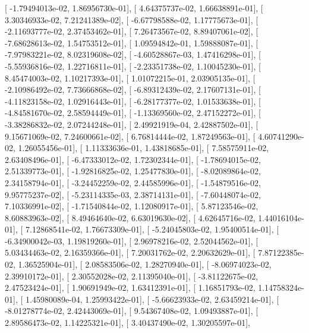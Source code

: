 \documentclass{article}
\begin{document}
       [ -1.79494013e-02,   1.86956730e-01],
       [  4.64375737e-02,   1.66638891e-01],
       [  3.30346933e-02,   7.21241389e-02],
       [ -6.67798588e-02,   1.17775673e-01],
       [ -2.11693777e-02,   2.37453462e-01],
       [  7.26473567e-02,   8.89407061e-02],
       [ -7.68628613e-02,   1.54753512e-01],
       [  1.09594842e-01,   1.59888087e-01],
       [ -7.97983221e-02,   8.02319608e-02],
       [ -4.60528867e-03,   1.47416298e-01],
       [ -5.55936816e-02,   1.22716811e-01],
       [ -2.23351738e-02,   1.10045230e-01],
       [  8.45474003e-02,   1.10217393e-01],
       [  1.01072215e-01,   2.03905135e-01],
       [ -2.10986492e-02,   7.73666868e-02],
       [ -6.89312439e-02,   2.17607131e-01],
       [ -4.11823158e-02,   1.02916443e-01],
       [ -6.28177377e-02,   1.01533638e-01],
       [ -4.84581670e-02,   2.58594449e-01],
       [ -1.13369560e-02,   2.47152272e-01],
       [ -3.38286832e-02,   2.07244248e-01],
       [  2.49921919e-04,   2.42887502e-01],
       [  9.15671069e-02,   7.24600661e-02],
       [  6.76814444e-02,   1.87249563e-01],
       [  4.60741290e-02,   1.26055456e-01],
       [  1.11333636e-01,   1.43818685e-01],
       [  7.58575911e-02,   2.63408496e-01],
       [ -6.47333012e-02,   1.72302344e-01],
       [ -1.78694015e-02,   2.51339773e-01],
       [ -1.92816825e-02,   1.25477830e-01],
       [ -8.02089864e-02,   2.34158794e-01],
       [ -3.24452259e-02,   2.44585996e-01],
       [ -1.54879516e-02,   9.95775237e-02],
       [ -5.23114335e-03,   2.38714131e-01],
       [ -7.60448074e-02,   7.10336991e-02],
       [ -1.71540844e-02,   1.12080917e-01],
       [  5.87123546e-02,   8.60883963e-02],
       [  8.49464640e-02,   6.63019630e-02],
       [  4.62645716e-02,   1.44016104e-01],
       [  7.12868541e-02,   1.76673309e-01],
       [ -5.24045803e-02,   1.95400514e-01],
       [ -6.34900042e-03,   1.19819260e-01],
       [  2.96978216e-02,   2.52044562e-01],
       [  5.03434463e-02,   2.16359366e-01],
       [  7.20031762e-02,   2.20632629e-01],
       [  7.87122385e-02,   1.36525904e-01],
       [  2.08583506e-02,   1.28270940e-01],
       [ -8.06974023e-02,   2.39910172e-01],
       [  2.30552028e-02,   2.11395040e-01],
       [ -3.81122675e-02,   2.47523424e-01],
       [  1.90691949e-02,   1.63412391e-01],
       [  1.16851793e-02,   1.14758324e-01],
       [  1.45980089e-04,   1.25993422e-01],
       [ -5.66623933e-02,   2.63459214e-01],
       [ -8.01278774e-02,   2.42443069e-01],
       [  9.54367408e-02,   1.09493887e-01],
       [  2.89586473e-02,   1.14225321e-01],
       [  3.40437490e-02,   1.30205597e-01],
\end{document}
